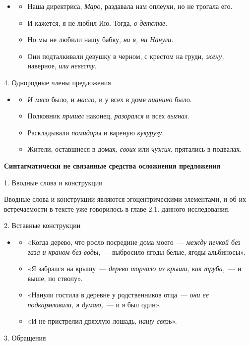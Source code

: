 \documentclass{kursa4}
\begin{document}
    \begin{itemize}
    \item \begin{itemize}
    \item Наша директриса, \textit{Маро}, раздавала нам оплеухи, но не
    трогала его.
    \item И кажется, я не любил Ию. Тогда, \textit{в детстве}.
    \item Но мы не любили нашу бабку, \textit{ни я, ни Нанули.}
    \item Они подталкивали девушку в черном, с крестом на груди,
    \textit{жену,} наверное, \textit{или} \textit{невесту}.
    \end{itemize}
    \end{itemize}
    4. Однородные члены предложения

    \begin{itemize}
    \item \begin{itemize}
    \item \textit{И мясо }было, и\textit{ масло, }и у всех в доме\textit{
    пианино }было.\textit{ }
    \item Полковник \textit{пришел }наконец, \textit{разорался }и
    всех\textit{ выгнал.}
    \item Раскладывали \textit{помидоры} и вареную \textit{кукурузу}.
    \item Жители, оставшиеся в домах, \textit{своих} или \textit{чужих},
    прятались в подвалах.
    \end{itemize}
    \end{itemize}

    \bigskip

    {\centering
    \textbf{{Синтагматически не связанные средства
    осложнения предложения}}
    \par}

    {1. Вводные слова и конструкции}

    {Вводные слова и конструкции являются
    эгоцентрическими элементами, и об их встречаемости в тексте уже
    говорилось в главе 2.1. данного исследования. }

    {2. Вставные конструкции}

    \begin{itemize}
    \item \begin{itemize}
    \item {«Когда дерево, что росло посредине дома моего~---
    }\textit{{между печкой без газа и краном без воды,
    }}{— выбросило ягоды белые, ягоды-альбиносы».}
    \item {«Я забрался на крышу~---
    }\textit{{дерево торчало из крыши, как
    труба,}}{~--- и выше, по стволу».}
    \item «Нанули гостила в деревне у родственников отца~--- \textit{они ее
    подкармливали, я думаю,}~--- и я был один».
    \item «И не пристрелил дряхлую лошадь, \textit{нашу связь}».
    \end{itemize}
    \end{itemize}
    3. Обращения
\end{document}
